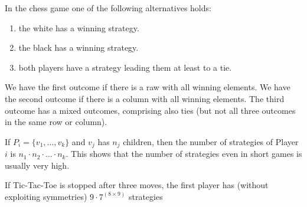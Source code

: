 \begin{theorem}
    In the chess game one of the following alternatives holds:
    \begin{enumerate}
        \item the white has a winning strategy.
        \item the black has a winning strategy.
        \item both players have a strategy leading them at least to a tie.
    \end{enumerate}
\end{theorem}
We have the first outcome if there is a raw with all winning elements. 
We have the second outcome if there is a column with all winning elements. 
The third outcome has a mixed outcomes, comprising also ties (but not all three outcomes in the same row or column). 

If $P_i = \{v_1, \dots, v_k \}$ and $v_j$ has $n_j$ children, then the number of strategies of Player $i$ is $n_1 \cdot n_2 \cdot \dots \cdot n_k$. 
This shows that the number of strategies even in short games is usually very high.
\begin{example}
    If Tic-Tac-Toe is stopped after three moves, the first player has (without exploiting symmetries) $9 \cdot 7 ^{(8\times9)}$ strategies
\end{example}

